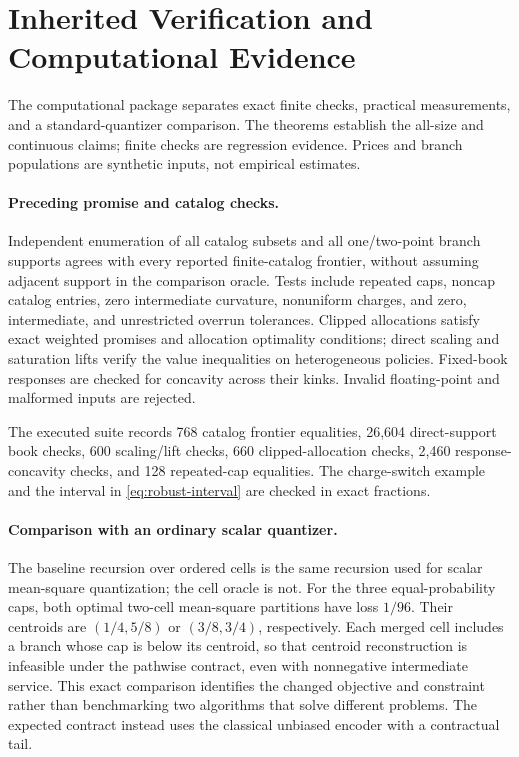 \section{Inherited Verification and Computational Evidence}\label{sec:r37-evidence}
The computational package separates exact finite checks, practical measurements, and a standard-quantizer comparison. The theorems establish the all-size and continuous claims; finite checks are regression evidence. Prices and branch populations are synthetic inputs, not empirical estimates.

\paragraph{Preceding promise and catalog checks.}
Independent enumeration of all catalog subsets and all one/two-point branch supports agrees with every reported finite-catalog frontier, without assuming adjacent support in the comparison oracle. Tests include repeated caps, noncap catalog entries, zero intermediate curvature, nonuniform charges, and zero, intermediate, and unrestricted overrun tolerances. Clipped allocations satisfy exact weighted promises and allocation optimality conditions; direct scaling and saturation lifts verify the value inequalities on heterogeneous policies. Fixed-book responses are checked for concavity across their kinks. Invalid floating-point and malformed inputs are rejected.

The executed suite records 768 catalog frontier equalities, 26,604 direct-support book checks, 600 scaling/lift checks, 660 clipped-allocation checks, 2,460 response-concavity checks, and 128 repeated-cap equalities. The charge-switch example and the interval in \eqref{eq:robust-interval} are checked in exact fractions.

\paragraph{Comparison with an ordinary scalar quantizer.}
The baseline recursion over ordered cells is the same recursion used for scalar mean-square quantization; the cell oracle is not. For the three equal-probability caps, both optimal two-cell mean-square partitions have loss $1/96$. Their centroids are $(1/4,5/8)$ or $(3/8,3/4)$, respectively. Each merged cell includes a branch whose cap is below its centroid, so that centroid reconstruction is infeasible under the pathwise contract, even with nonnegative intermediate service. This exact comparison identifies the changed objective and constraint rather than benchmarking two algorithms that solve different problems. The expected contract instead uses the classical unbiased encoder with a contractual tail.

